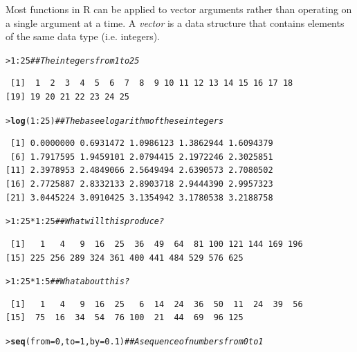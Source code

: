 \documentclass[12pt,oneside]{book}\usepackage[]{graphicx}\usepackage[]{color}
\makeatletter
\newcommand{\hlnum}[1]{\textcolor[rgb]{0.686,0.059,0.569}{#1}}%
\newcommand{\hlcom}[1]{\textcolor[rgb]{0.678,0.584,0.686}{\textit{#1}}}%
\newcommand{\hlopt}[1]{\textcolor[rgb]{0,0,0}{#1}}%
\newcommand{\hlstd}[1]{\textcolor[rgb]{0.345,0.345,0.345}{#1}}%
\newcommand{\hlkwc}[1]{\textcolor[rgb]{0.333,0.667,0.333}{#1}}%
\newcommand{\hlkwd}[1]{\textcolor[rgb]{0.737,0.353,0.396}{\textbf{#1}}}%
\newenvironment{kframe}{%
 \def\at@end@of@kframe{}%
 \ifinner\ifhmode%
  \def\at@end@of@kframe{\end{minipage}}%
  \begin{minipage}{\columnwidth}%
 \fi\fi%
 \def\FrameCommand##1{\hskip\@totalleftmargin \hskip-\fboxsep
 \colorbox{shadecolor}{##1}\hskip-\fboxsep
     \hskip-\linewidth \hskip-\@totalleftmargin \hskip\columnwidth}%
 \MakeFramed {\advance\hsize-\width
   \@totalleftmargin\z@ \linewidth\hsize
   \@setminipage}}%
 {\par\unskip\endMakeFramed%
 \at@end@of@kframe}
\newenvironment{knitrout}{}{} %
\makeatother
\begin{document}
Most functions in R can be applied to vector arguments rather than operating on a single argument at a time. A \emph{vector} is a data structure that contains elements of the same data type (i.e. integers).

\begin{knitrout}
\color{fgcolor}\begin{kframe}
\begin{alltt}
\hlstd{> }\hlnum{1}\hlopt{:}\hlnum{25}  \hlcom{##The integers from 1 to 25}
\end{alltt}
\begin{verbatim}
 [1]  1  2  3  4  5  6  7  8  9 10 11 12 13 14 15 16 17 18
[19] 19 20 21 22 23 24 25
\end{verbatim}
\begin{alltt}
\hlstd{> }\hlkwd{log}\hlstd{(}\hlnum{1}\hlopt{:}\hlnum{25}\hlstd{)}  \hlcom{##The base e logarithm of these integers}
\end{alltt}
\begin{verbatim}
 [1] 0.0000000 0.6931472 1.0986123 1.3862944 1.6094379
 [6] 1.7917595 1.9459101 2.0794415 2.1972246 2.3025851
[11] 2.3978953 2.4849066 2.5649494 2.6390573 2.7080502
[16] 2.7725887 2.8332133 2.8903718 2.9444390 2.9957323
[21] 3.0445224 3.0910425 3.1354942 3.1780538 3.2188758
\end{verbatim}
\begin{alltt}
\hlstd{> }\hlnum{1}\hlopt{:}\hlnum{25} \hlopt{*} \hlnum{1}\hlopt{:}\hlnum{25}  \hlcom{##What will this produce?}
\end{alltt}
\begin{verbatim}
 [1]   1   4   9  16  25  36  49  64  81 100 121 144 169 196
[15] 225 256 289 324 361 400 441 484 529 576 625
\end{verbatim}
\begin{alltt}
\hlstd{> }\hlnum{1}\hlopt{:}\hlnum{25} \hlopt{*} \hlnum{1}\hlopt{:}\hlnum{5}  \hlcom{##What about this?}
\end{alltt}
\begin{verbatim}
 [1]   1   4   9  16  25   6  14  24  36  50  11  24  39  56
[15]  75  16  34  54  76 100  21  44  69  96 125
\end{verbatim}
\begin{alltt}
\hlstd{> }\hlkwd{seq}\hlstd{(}\hlkwc{from} \hlstd{=} \hlnum{0}\hlstd{,} \hlkwc{to} \hlstd{=} \hlnum{1}\hlstd{,} \hlkwc{by} \hlstd{=} \hlnum{0.1}\hlstd{)}  \hlcom{##A sequence of numbers from 0 to 1}
\end{alltt}
\begin{verbatim}

\end{verbatim}
\end{kframe}
\end{knitrout}
\end{document}
